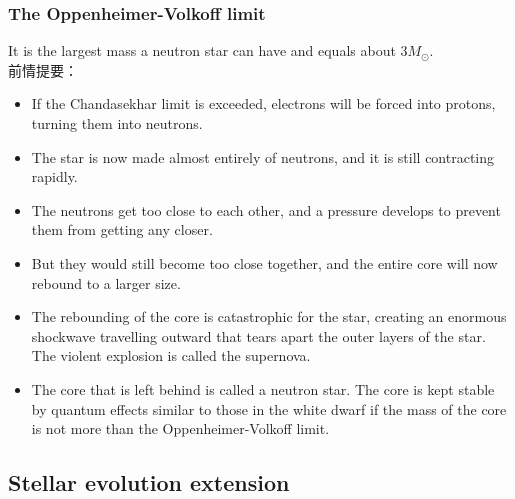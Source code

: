 \documentclass[a4paper,12pt]{article}
\begin{document}
\subsubsection*{The Oppenheimer-Volkoff limit}
It is the largest mass a neutron star can have and equals about $3M_\odot$.\\
前情提要：
\begin{itemize}
  \item If the Chandasekhar limit is exceeded, electrons will be forced into protons, turning them into neutrons.
  \item The star is now made almost entirely of neutrons, and it is still contracting rapidly. 
  \item The neutrons get too close to each other, and a pressure develops to prevent them from getting any closer.
  \item But they would still become too close together, and the entire core will now rebound to a larger size.
  \item The rebounding of the core is catastrophic for the star, creating an enormous shockwave travelling outward that tears apart the outer layers of the star. The violent explosion is called the supernova.
  \item The core that is left behind is called a neutron star. The core is kept stable by quantum effects similar to those in the white dwarf if the mass of the core is not more than the Oppenheimer-Volkoff limit. 
\end{itemize}
\subsection{Stellar evolution extension}
\end{document}
